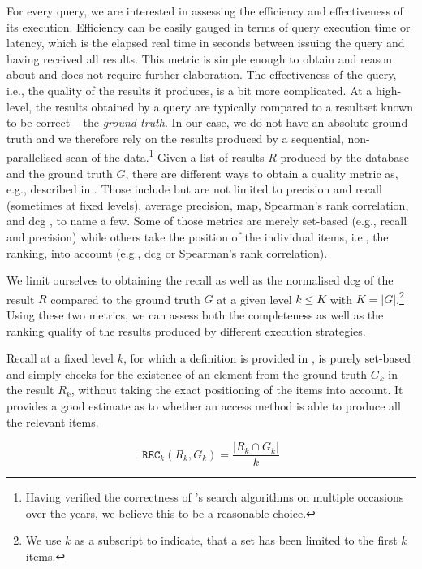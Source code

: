 For every query, we are interested in assessing the efficiency and effectiveness of its execution. Efficiency can be easily gauged in terms of query execution time or latency, which is the elapsed real time in seconds between issuing the query and having received all results. This metric is simple enough to obtain and reason about and does not require further elaboration. The effectiveness of the query, i.e., the quality of the results it produces, is a bit more complicated. At a high-level, the results obtained by a query are typically compared to a resultset known to be correct -- the \emph{ground truth}. In our case, we do not have an absolute ground truth and we therefore rely on the results produced by a sequential, non-parallelised scan of the data.\footnote{Having verified the correctness of \cottontail{}'s search algorithms on multiple occasions over the years, we believe this to be a reasonable choice.} Given a list of results $R$ produced by the database and the ground truth $G$, there are different ways to obtain a quality metric as, e.g., described in \cite{Webber:2010Similarity}. Those include but are not limited to precision and recall (sometimes at fixed levels), average precision, \acrfull{map}, Spearman's rank correlation, and \acrfull{dcg} \cite{Jarvelin:2002Cumulated}, to name a few. Some of those metrics are merely set-based (e.g., recall and precision) while others take the position of the individual items, i.e., the ranking, into account (e.g., \acrshort{dcg} or Spearman's rank correlation).

We limit ourselves to obtaining the recall as well as the normalised \acrshort{dcg} \cite{Jarvelin:2002Cumulated} of the result $R$ compared to the ground truth $G$ at a given level $k \leq K$ with $K = |G|$.\footnote{We use $k$ as a subscript to indicate, that a set has been limited to the first $k$ items.} Using these two metrics, we can assess both the completeness as well as the ranking quality of the results produced by different execution strategies.

Recall at a fixed level $k$, for which a definition is provided in , is purely set-based and simply checks for the existence of an element from the ground truth $G_k$ in the result $R_k$, without taking the exact positioning of the items into account. It provides a good estimate as to whether an access method is able to produce all the relevant items.

\begin{equation}
    \label{equation:recall}
    \texttt{REC}_k (R_k, G_k) = \frac{|R_k \cap G_k |}{k}
\end{equation}

